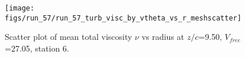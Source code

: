 \begin{figure}[H]
\centering
\texttt{[image: figs/run\_57/run\_57\_turb\_visc\_by\_vtheta\_vs\_r\_meshscatter]}
\caption{Scatter plot of mean total viscosity $\nu$ vs radius at $z/c$=9.50, $V_{free}$=27.05, station 6.}
\label{fig:run_57_turb_visc_by_vtheta_vs_r_meshscatter}
\end{figure}


